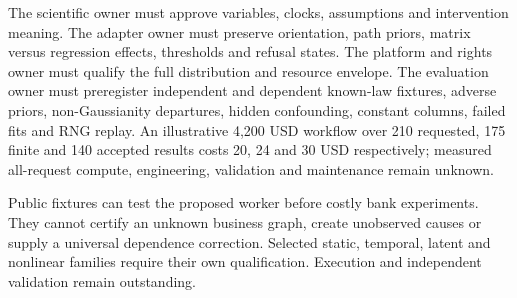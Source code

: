 The scientific owner must approve variables, clocks, assumptions and
intervention meaning. The adapter owner must preserve orientation, path
priors, matrix versus regression effects, thresholds and refusal states.
The platform and rights owner must qualify the full distribution and
resource envelope. The evaluation owner must preregister independent and
dependent known-law fixtures, adverse priors, non-Gaussianity departures,
hidden confounding, constant columns, failed fits and RNG replay.
An illustrative 4,200 USD workflow over 210 requested, 175 finite and
140 accepted results costs 20, 24 and 30 USD respectively; measured
all-request compute, engineering, validation and maintenance remain unknown.
\citep{exec24_lingam_choice}

Public fixtures can test the proposed worker before costly bank experiments.
They cannot certify an unknown business graph, create unobserved causes
or supply a universal dependence correction. Selected static, temporal,
latent and nonlinear families require their own qualification. Execution and independent validation remain outstanding.
\citep{exec24_lingam_choice}
